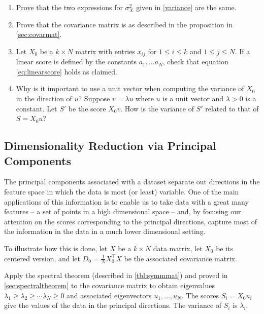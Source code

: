 \documentclass[
]{article}
\begin{document}
\begin{enumerate}
\def\labelenumi{\arabic{enumi}.}
\item
  Prove that the two expressions for \(\sigma_{X}^2\) given in
  \cref{variance} are the same.
\item
  Prove that the covariance matrix is as described in the proposition in
  \ref{sec:covarmat}.
\item
  Let \(X_{0}\) be a \(k\times N\) matrix with entries \(x_{ij}\) for
  \(1\le i\le k\) and \(1\le j\le N\). If a linear score is defined by
  the constants \(a_{1},\ldots a_{N}\), check that equation
  \cref{eq:linearscore} holds as claimed.
\item
  Why is it important to use a unit vector when computing the variance
  of \(X_{0}\) in the direction of \(u\)? Suppose \(v=\lambda u\) where
  \(u\) is a unit vector and \(\lambda>0\) is a constant. Let \(S'\) be
  the score \(X_{0}v\). How is the variance of \(S'\) related to that of
  \(S=X_{0}u\)?
\end{enumerate}

\hypertarget{dimensionality-reduction-via-principal-components}{%
\subsection{Dimensionality Reduction via Principal
Components}\label{dimensionality-reduction-via-principal-components}}

The principal components associated with a dataset separate out
directions in the feature space in which the data is most (or least)
variable. One of the main applications of this information is to enable
us to take data with a great many features -- a set of points in a high
dimensional space -- and, by focusing our attention on the scores
corresponding to the principal directions, capture most of the
information in the data in a much lower dimensional setting.

To illustrate how this is done, let \(X\) be a \(k\times N\) data
matrix, let \(X_{0}\) be its centered version, and let
\(D_{0} = \frac{1}{N}X_{0}^{\intercal}X\) be the associated covariance
matrix.

Apply the spectral theorem (described in \cref{tbl:symmmat}) and proved
in \cref{sec:spectraltheorem} to the covariance matrix to obtain
eigenvalues \(\lambda_{1}\ge \lambda_{2}\ge\cdots \lambda_{N}\ge 0\) and
associated eigenvectors \(u_{1},\ldots, u_{N}\). The scores
\(S_{i}=X_{0}u_{i}\) give the values of the data in the principal
directions. The variance of \(S_{i}\) is \(\lambda_{i}\).
\end{document}
